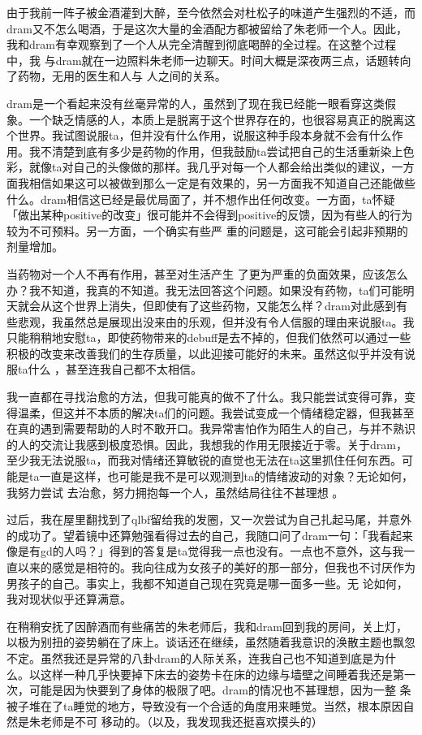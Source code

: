\documentclass{article}
\begin{document}
由于我前一阵子被金酒灌到大醉，至今依然会对杜松子的味道产生强烈的不适，而dram又不怎么喝酒，于是这次大量的金酒配方都被留给了朱老师一个人。因此，我和dram有幸观察到了一个人从完全清醒到彻底喝醉的全过程。在这整个过程中，我
\newpage
与dram就在一边照料朱老师一边聊天。时间大概是深夜两三点，话题转向了药物，无用的医生和人与
人之间的关系。 

dram是一个看起来没有丝毫异常的人，虽然到了现在我已经能一眼看穿这类假象。一个缺乏情感的人，本质上是脱离于这个世界存在的，也很容易真正的脱离这个世界。我试图说服ta，但并没有什么作用，说服这种手段本身就不会有什么作用。我不清楚到底有多少是药物的作用，但我鼓励ta尝试把自己的生活重新染上色彩，就像ta对自己的头像做的那样。我几乎对每一个人都会给出类似的建议，一方面我相信如果这可以被做到那么一定是有效果的，另一方面我不知道自己还能做些什么。dram相信这已经是最优局面了，并不想作出任何改变。一方面，ta怀疑「做出某种positive的改变」很可能并不会得到positive的反馈，因为有些人的行为较为不可预料。另一方面，一个确实有些严
重的问题是，这可能会引起非预期的剂量增加。 

当药物对一个人不再有作用，甚至对生活产生
\newpage
了更为严重的负面效果，应该怎么办？我不知道，我真的不知道。我无法回答这个问题。如果没有药物，ta们可能明天就会从这个世界上消失，但即使有了这些药物，又能怎么样？dram对此感到有些悲观，我虽然总是展现出没来由的乐观，但并没有令人信服的理由来说服ta。我只能稍稍地安慰ta，即使药物带来的debuff是去不掉的，但我们依然可以通过一些积极的改变来改善我们的生存质量，以此迎接可能好的未来。虽然这似乎并没有说服ta什么
，甚至连我自己都不太相信。 

我一直都在寻找治愈的方法，但我可能真的做不了什么。我只能尝试变得可靠，变得温柔，但这并不本质的解决ta们的问题。我尝试变成一个情绪稳定器，但我甚至在真的遇到需要帮助的人时不敢开口。我异常害怕作为陌生人的自己，与并不熟识的人的交流让我感到极度恐惧。因此，我想我的作用无限接近于零。关于dram，至少我无法说服ta，而我对情绪还算敏锐的直觉也无法在ta这里抓住任何东西。可能是ta一直是这样，也可能是我不是可以观测到ta的情绪波动的对象？无论如何，我努力尝试
\newpage
去治愈，努力拥抱每一个人，虽然结局往往不甚理想
。 

过后，我在屋里翻找到了qlbf留给我的发圈，又一次尝试为自己扎起马尾，并意外的成功了。望着镜中还算勉强看得过去的自己，我随口问了dram一句：「我看起来像是有gd的人吗？」得到的答复是ta觉得我一点也没有。一点也不意外，这与我一直以来的感觉是相符的。我向往成为女孩子的美好的那一部分，但我也不讨厌作为男孩子的自己。事实上，我都不知道自己现在究竟是哪一面多一些。无
论如何，我对现状似乎还算满意。 

在稍稍安抚了因醉酒而有些痛苦的朱老师后，我和dram回到我的房间，关上灯，以极为别扭的姿势躺在了床上。谈话还在继续，虽然随着我意识的涣散主题也飘忽不定。虽然我还是异常的八卦dram的人际关系，连我自己也不知道到底是为什么。以这样一种几乎快要掉下床去的姿势卡在床的边缘与墙壁之间睡着我还是第一次，可能是因为快要到了身体的极限了吧。dram的情况也不甚理想，因为一整
\newpage
条被子堆在了ta睡觉的地方，导致没有一个合适的角度用来睡觉。当然，根本原因自然是朱老师是不可
移动的。（以及，我发现我还挺喜欢摸头的） 
\end{document}

